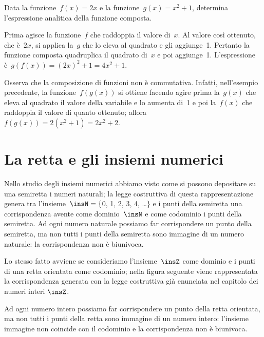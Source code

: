 \begin{center}
 
\end{center}

\begin{exrig}
 \begin{esempio}
 Data la funzione~$f(x)=2x$ e la funzione~$g(x)=x^2+1$, determina
l'espressione analitica della funzione composta.

Prima agisce la funzione~$f$ che raddoppia il valore di~$x$. Al valore
così ottenuto, che è~$2x$, si applica la~$g$ che lo eleva al quadrato
e gli aggiunge~1. Pertanto
la funzione composta quadruplica il quadrato di~$x$ e poi aggiunge~1.
L'espressione è~$g(f(x))=(2x)^2+1 = 4x^2+1$.
 \end{esempio}

\end{exrig}

Osserva che la composizione di funzioni non è commutativa. Infatti, nell'esempio precedente, la
funzione~$f(g(x))$ si ottiene facendo agire prima la~$g(x)$ che eleva
al quadrato il valore della variabile e lo aumenta di~1
e poi la~$f(x)$ che raddoppia il valore di quanto ottenuto;
allora~$f(g(x))=2(x^2+1)=2x^2+2$.

\vspazio\ovalbox{\risolvi \ref{ese:D.14}}

\section{La retta e gli insiemi numerici}

Nello studio degli insiemi numerici abbiamo visto come si possono depositare su una semiretta i numeri naturali;
la legge costruttiva di questa rappresentazione genera tra l'insieme~$\insN=\{$0, 1, 2, 3, 4, \ldots$\}$ e i punti della
semiretta una corrispondenza avente come dominio~$\insN$ e come codominio i punti della semiretta.
Ad ogni numero naturale possiamo far corrispondere un punto della semiretta, ma non tutti i punti della semiretta
sono immagine di un numero naturale: la corrispondenza non è biunivoca.

Lo stesso fatto avviene se consideriamo l'insieme~$\insZ$ come dominio e i punti di una retta orientata come codominio;
nella figura seguente viene rappresentata la corrispondenza generata con la legge costruttiva già enunciata nel capitolo dei numeri interi $\insZ$.
\begin{center}
 
\end{center}
Ad ogni numero intero possiamo far corrispondere un punto della retta orientata, ma non tutti i punti della retta sono immagine
di un numero intero: l'insieme immagine non coincide con il codominio e la corrispondenza non è biunivoca.


